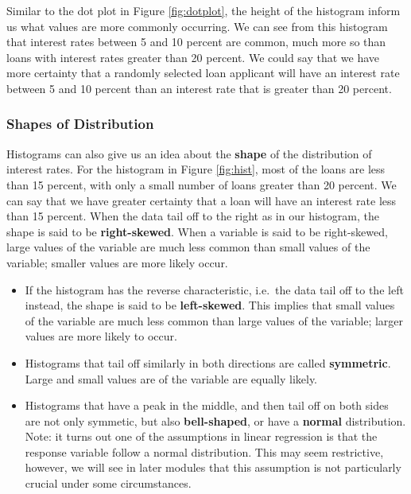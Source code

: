 \documentclass[
]{book}
\begin{document}
Similar to the dot plot in Figure \ref{fig:dotplot}, the height of the histogram inform us what values are more commonly occurring. We can see from this histogram that interest rates between 5 and 10 percent are common, much more so than loans with interest rates greater than 20 percent. We could say that we have more certainty that a randomly selected loan applicant will have an interest rate between 5 and 10 percent than an interest rate that is greater than 20 percent.

\subsubsection{Shapes of Distribution}\label{shapes-of-distribution}

Histograms can also give us an idea about the \textbf{shape} of the distribution of interest rates. For the histogram in Figure \ref{fig:hist}, most of the loans are less than 15 percent, with only a small number of loans greater than 20 percent. We can say that we have greater certainty that a loan will have an interest rate less than 15 percent. When the data tail off to the right as in our histogram, the shape is said to be \textbf{right-skewed}. When a variable is said to be right-skewed, large values of the variable are much less common than small values of the variable; smaller values are more likely occur.

\begin{itemize}
\item
  If the histogram has the reverse characteristic, i.e.~the data tail off to the left instead, the shape is said to be \textbf{left-skewed}. This implies that small values of the variable are much less common than large values of the variable; larger values are more likely to occur.
\item
  Histograms that tail off similarly in both directions are called \textbf{symmetric}. Large and small values are of the variable are equally likely.
\item
  Histograms that have a peak in the middle, and then tail off on both sides are not only symmetic, but also \textbf{bell-shaped}, or have a \textbf{normal} distribution. Note: it turns out one of the assumptions in linear regression is that the response variable follow a normal distribution. This may seem restrictive, however, we will see in later modules that this assumption is not particularly crucial under some circumstances.
\end{itemize}
\end{document}
